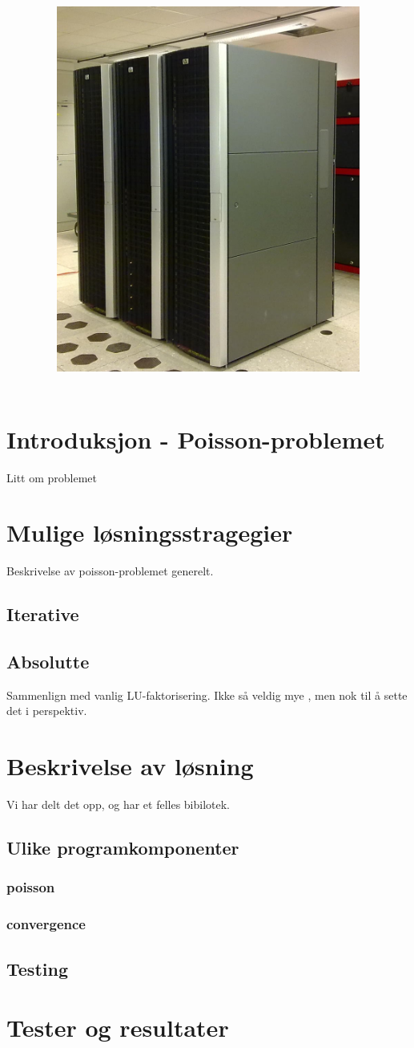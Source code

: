 \documentclass{article}
\title{
\vspace*{\stretch{1}}
\noindent\HRule
\begin{center}
 \Huge
 \noindent	\exerciseClass \\
 \noindent \exerciseTitle \\ [4mm]
 \large
 \noindent\emph{\exerciseGroupMembers}
\noindent\HRule \newline
\end{center}
\vspace{0cm}
\begin{center}
	\includegraphics[width=10cm]{img/kongull.jpg}
\end{center}
\vspace*{\stretch{3}}
\begin{center}
\end{center}
}
\begin{document}
\pagestyle{empty}
\maketitle

\thispagestyle{empty}

\newpage \tableofcontents


\newpage


\section{Introduksjon - Poisson-problemet}
Litt om problemet

\section{Mulige løsningsstragegier}
Beskrivelse av poisson-problemet generelt.
\subsection{Iterative}
\subsection{Absolutte}
Sammenlign med vanlig LU-faktorisering. Ikke så veldig mye , men nok til å sette det i perspektiv.

\section{Beskrivelse av løsning}
Vi har delt det opp, og har et felles bibilotek.

\subsection{Ulike programkomponenter}
\subsubsection{poisson}
\subsubsection{convergence}

\subsection{Testing}

\section{Tester og resultater}
\end{document}
